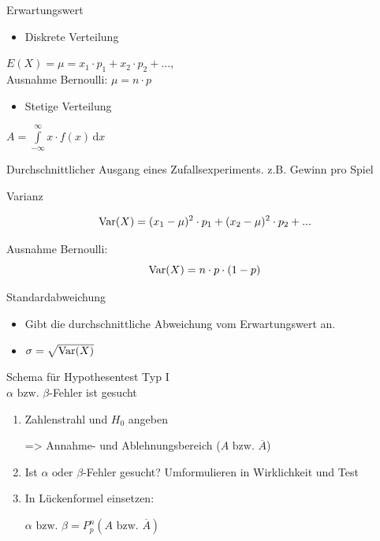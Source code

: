 \documentclass[paper=a6,ngerman,twoside=true,fontsize=14pt, parskip = half]{scrartcl}
\begin{document}
\begin{frage}
	Erwartungswert
\end{frage}
\begin{antwort}
	\begin{itemize}
		\item Diskrete Verteilung
	\end{itemize}
	$E(X)=\mu=x_1 \cdot p_1 + x_2 \cdot p_2 + ...$,\\
	Ausnahme Bernoulli: $\mu=n \cdot p$
	\begin{itemize}
		\item Stetige Verteilung
	\end{itemize}
	$A=\displaystyle\int\limits_{-\infty}^{\infty} \!x\cdot f(x) \, \mathrm{d}x$
	
	Durchschnittlicher Ausgang eines Zufallsexperiments.
	z.B. Gewinn pro Spiel
\end{antwort}	
\begin{frage}
	Varianz
	
\end{frage}
\begin{antwort}
	 \[\text{Var}(X)=(x_1-\mu)^2 \cdot p_1+(x_2-\mu)^2 \cdot p_2+...\]
	\bigskip

	Ausnahme Bernoulli: \[\text{Var}(X)=n \cdot p \cdot (1-p)\]	
\end{antwort}	
\begin{frage}
	Standardabweichung
	
\end{frage}
\begin{antwort}
	\begin{itemize}
		\item Gibt die durchschnittliche Abweichung vom Erwartungswert an.		
		\item $\sigma=\sqrt{\text{Var}(X)}$	
	\end{itemize}	
\end{antwort}	
\begin{frage}
	Schema für Hypothesentest Typ I\\
	$\alpha \text{ bzw. }\beta$-Fehler ist gesucht
	
\end{frage}
\begin{antwort}
	\begin{enumerate}
		\item Zahlenstrahl und $H_0$ angeben
		
		=> Annahme- und Ablehnungsbereich  ($A \text{ bzw. }\overline{A}$)	
		\item Ist  $\alpha \text{ oder }\beta$-Fehler gesucht? Umformulieren in Wirklichkeit und Test
		\item In Lückenformel einsetzen: 
		
		$\alpha \text{ bzw. }\beta=P^n_p(A\text{ bzw. }\overline{A})$	
	\end{enumerate}
	
\end{antwort}	
\end{document}
